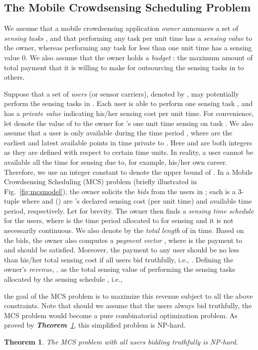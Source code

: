 \documentclass[10pt,journal,compsoc]{IEEEtran}
\newtheorem{theorem}{\textbf{Theorem}}
\begin{document}
  \subsection{The Mobile Crowdsensing Scheduling Problem}
We assume that a mobile crowdsensing application \textit{owner} announces a set of \textit{sensing tasks} , and that performing any task  per unit time has a \textit{sensing value}  to the owner, whereas performing any task for less than one unit time has a sensing value 0.
We also assume that the owner holds a \textit{budget} : the maximum amount of total payment that it is willing to make for outsourcing the sensing tasks in  to others.

    Suppose that a set of \textit{users} (or sensor carriers), denoted by , may potentially perform the sensing tasks in . Each user  is able to perform one sensing task , and has a \textit{private value}  indicating his/her sensing cost per unit time. For convenience, let  denote the value of  to the owner for 's one unit time sensing on task . We also assume that a user  is only available during the time period , where  are the earliest and latest available points in time private to . Here  and  are both integers as they are defined with respect to certain time units. In reality, a user cannot be available all the time for sensing due to, for example, his/her own career. Therefore, we use an integer constant  to denote the upper bound of . 
    In a Mobile Crowdsensing Scheduling (MCS) problem (briefly illustrated in Fig.~\ref{fig:mcsmodel}), the owner solicits the \textit{bids}  from the users in ; each  is a 3-tuple  where  and  () are 's declared sensing cost (per unit time) and available time period, respectively. Let  for brevity. The owner then finds a \textit{sensing time schedule}  for the users, where  is the time period allocated to  for sensing and it is not necessarily continuous. We also denote by  the \textit{total length} of  in time. Based on the bids, the owner also computes a \textit{payment vector} , where  is the payment to  and  should be satisfied. Moreover, the payment to any user  should be no less than his/her total sensing cost if all users bid truthfully, i.e., . Defining the owner's \textit{revenue}, , as the total sensing value of performing the sensing tasks allocated by the sensing schedule , i.e.,

the goal of the MCS problem is to maximize this revenue subject to all the above constraints. Note that should we assume that the users always bid truthfully, the MCS problem would become a pure combinatorial optimization problem. As proved by \textit{\textbf{Theorem}~\ref{thm:nphard}}, this simplified problem is NP-hard.
\begin{theorem}
      The MCS problem with all users bidding truthfully is NP-hard.
      \label{thm:nphard}
    \end{theorem}
\end{document}

